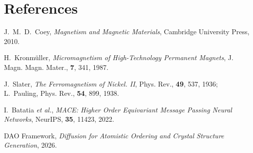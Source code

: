 \documentclass[10pt,a4paper]{article}
\begin{document}
\section*{References}
\begingroup
\footnotesize
\begin{enumerate}[label={[\arabic*]}, leftmargin=1.5em, itemsep=-3pt, topsep=1pt]
  \item J.~M.~D.~Coey, \emph{Magnetism and Magnetic Materials}, Cambridge University Press, 2010.
  \item H.~Kronmüller, \emph{Micromagnetism of High-Technology Permanent Magnets}, J. Magn. Magn. Mater., \textbf{7}, 341, 1987.
  \item J.~Slater, \emph{The Ferromagnetism of Nickel. II}, Phys. Rev., \textbf{49}, 537, 1936; L.~Pauling, Phys. Rev., \textbf{54}, 899, 1938.
  \item I.~Batatia \emph{et al.}, \emph{MACE: Higher Order Equivariant Message Passing Neural Networks}, NeurIPS, \textbf{35}, 11423, 2022.
  \item DAO Framework, \emph{Diffusion for Atomistic Ordering and Crystal Structure Generation}, 2026.
\end{enumerate}
\endgroup
\end{document}
